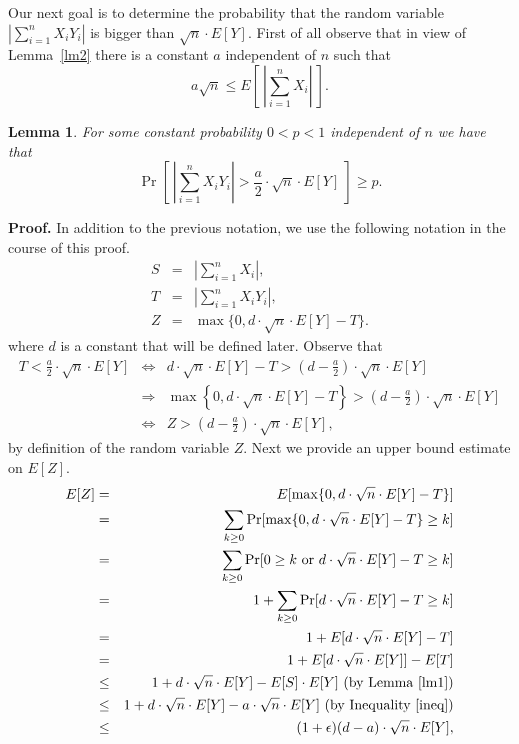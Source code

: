 \documentclass[12pt]{article}
\newtheorem{lemma}{Lemma}
\begin{document}
Our next goal is to determine the probability 
that the random variable $\left| \sum_{i=1}^n X_i Y_i \right|$
is bigger than $\sqrt{n} \cdot E[Y]$.
First of all observe that in
view of Lemma~\ref{lm2}
there is a constant $a$ independent of $n$ 
such that 
\begin{equation}
\label{ineq}
a \sqrt{n} \leq E\left[~\left| \sum_{i=1}^n X_i \right|~\right].
\end{equation}
\begin{lemma}
\label{lm6}
For some constant probability $0 < p < 1$ independent of $n$ we have that
\begin{equation}
\label{rv9:eq}
\Pr \left[ ~\left| \sum_{i=1}^n X_i Y_i \right| > \frac{a}{2} 
\cdot \sqrt{n} \cdot E[Y]  ~ \right]
\geq p .
\end{equation}
\end{lemma}
{\bf Proof.} 
In addition to the previous notation,
we use the following notation in the course of this proof.
\begin{eqnarray*}
S & = & 
\left| \sum_{i=1}^n X_i \right| ,\\
T & = & 
\left| \sum_{i=1}^n X_i Y_i \right| ,\\
Z & = &
\max \{ 0, d \cdot \sqrt{n} \cdot E[Y] - T \} .
\end{eqnarray*}
where $d$ is a constant that will be defined later. 
Observe that
\begin{eqnarray}
T < \frac{a}{2} \cdot \sqrt{n} \cdot E[Y]
& \Leftrightarrow & 
\label{Zineq1}
d \cdot \sqrt{n} \cdot E[Y] - T > 
\left( d - \frac{a}{2}\right) \cdot \sqrt{n} \cdot E[Y] \\
& \Rightarrow & 
\label{Zineq2}
\max\left\{ 0, d \cdot \sqrt{n} \cdot E[Y] - T \right\} >
\left( d - \frac{a}{2}\right) \cdot \sqrt{n} \cdot E[Y] \\
& \Leftrightarrow &
\label{Zineq3} 
Z > \left( d - \frac{a}{2}\right) \cdot \sqrt{n} \cdot E[Y] ,
\end{eqnarray}
by definition of the random variable $Z$.
Next we provide an upper bound estimate on $E[Z]$.
\begin{eqnarray*}
E[Z] 
& = & 
E [\max \{ 0, d \cdot \sqrt{n} \cdot E[Y] - T \}] \\
& = & 
\sum_{k \geq 0} 
\Pr [\max \{ 0, d \cdot \sqrt{n} \cdot E[Y] - T \} \geq k] \\
& = & 
\sum_{k \geq 0} 
\Pr [0 \geq k \mbox{ or } d \cdot \sqrt{n} \cdot E[Y] - T \geq k] \\
& = & 
1 + \sum_{k \geq 0} \Pr [d \cdot \sqrt{n} \cdot E[Y] - T \geq k] \\
& = & 
1 + E[d \cdot \sqrt{n} \cdot E[Y] - T] \\
& = & 
1 + E[d \cdot \sqrt{n} \cdot E[Y]] - E[T] \\
& \leq & 
1 + d \cdot \sqrt{n} \cdot E[Y] - E[S] \cdot E[Y] 
\mbox{ (by Lemma~\ref{lm1})}\\
& \leq & 
1 + d \cdot \sqrt{n} \cdot E[Y] - a \cdot \sqrt{n} \cdot E[Y] 
\mbox{ (by Inequality~\ref{ineq})}\\
& \leq & 
(1 + \epsilon) (d-a) \cdot \sqrt{n} \cdot E[Y] ,
\end{eqnarray*}
\end{document}
